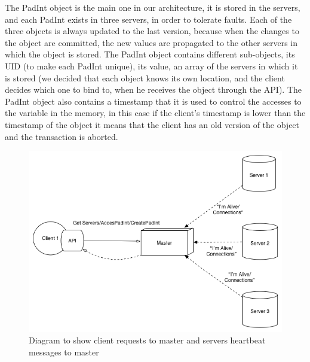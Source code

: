 \documentclass[times, 10pt,twocolumn]{article}
\begin{document}
The PadInt object is the main one in our architecture, it is stored in the servers, and each PadInt exists in three servers, in order to tolerate faults. Each of the three objects is always updated to the last version, because when the changes to the object are committed, the new values are propagated to the other servers in which the object is stored. The PadInt object contains different sub-objects, its UID (to make each PadInt unique), its value, an array of the servers in which it is stored (we decided that each object knows its own location, and the client decides which one to bind to, when he receives the object through the API). The PadInt object also contains a timestamp that it is used to control the accesses to the variable in the memory, in this case if the client's timestamp is lower than the timestamp of the object it means that the client has an old version of the object and the transaction is aborted.

\begin{figure}[h!]
	\centering
	\includegraphics[scale=0.4]{Client-Master.png}
	\caption{Diagram to show client requests to master and servers heartbeat messages to  master}
\end{figure}

\end{document}
